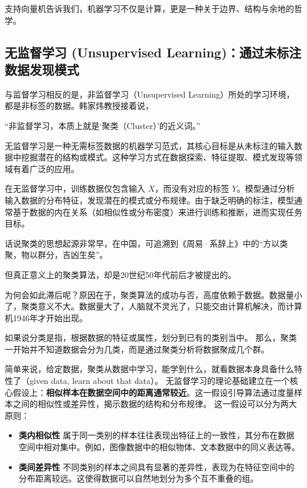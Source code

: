 支持向量机告诉我们，机器学习不仅是计算，更是一种关于边界、结构与余地的哲学。





\subsection{ 无监督学习 (Unsupervised Learning)：通过未标注数据发现模式}

与监督学习相反的是，非监督学习（Unsupervised Learning）所处的学习环境，都是非标签的数据。韩家炜教授接着说\cite{han2011data}，

“非监督学习，本质上就是‘聚类（Cluster）’的近义词。”

无监督学习是一种无需标签数据的机器学习范式，其核心目标是从未标注的输入数据中挖掘潜在的结构或模式。这种学习方式在数据探索、特征提取、模式发现等领域有着广泛的应用。

在无监督学习中，训练数据仅包含输入 $X$，而没有对应的标签 $Y$。模型通过分析输入数据的分布特征，发现潜在的模式或分布规律。由于缺乏明确的标注，模型通常基于数据的内在关系（如相似性或分布密度）来进行训练和推断，进而实现任务目标。

话说聚类的思想起源非常早，在中国，可追溯到《周易·系辞上》中的“方以类聚，物以群分，吉凶生矣”。

但真正意义上的聚类算法，却是20世纪50年代前后才被提出的。

为何会如此滞后呢？原因在于，聚类算法的成功与否，高度依赖于数据。数据量小了，聚类意义不大。数据量大了，人脑就不灵光了，只能交由计算机解决，而计算机1946年才开始出现。

如果说分类是指，根据数据的特征或属性，划分到已有的类别当中。
那么，聚类一开始并不知道数据会分为几类，而是通过聚类分析将数据聚成几个群。

简单来说，给定数据，聚类从数据中学习，能学到什么，就看数据本身具备什么特性了（given data, learn about that data）。
无监督学习的理论基础建立在一个核心假设上：{\bf 相似样本在数据空间中的距离通常较近}。这一假设引导算法通过度量样本之间的相似性或差异性，揭示数据的结构和分布规律。
这一假设可以分为两大原则：
\begin{itemize}
\item {\bf 类内相似性}  属于同一类别的样本往往表现出特征上的一致性，其分布在数据空间中相对集中。例如，图像数据中的相似物体、文本数据中的同义表达等。
\item {\bf 类间差异性}  不同类别的样本之间具有显著的差异性，表现为在特征空间中的分布距离较远。这使得数据可以自然地划分为多个互不重叠的组。
\end{itemize}

